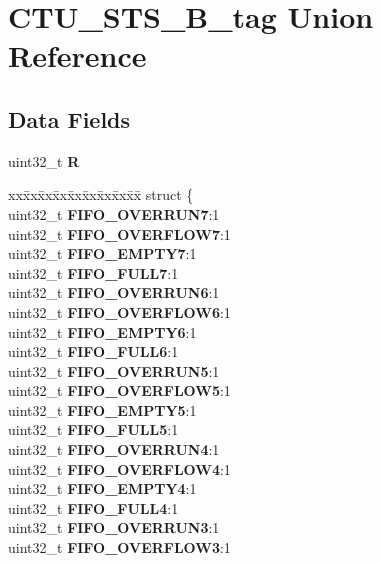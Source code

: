 \hypertarget{unionCTU__STS__32B__tag}{}\section{C\+T\+U\+\_\+\+S\+T\+S\+\_\+B\+\_\+tag Union Reference}
\label{unionCTU__STS__32B__tag}
\subsection*{Data Fields}
\begin{DoxyCompactItemize}
\item 
\mbox{\label{unionCTU__STS__32B__tag_a8c6f365750a958d9b6387c3a33d1c244}} 
uint32\+\_\+t {\bfseries R}
\item 
\mbox{\label{unionCTU__STS__32B__tag_aedca03611b0fa95a491ea184167556b8}} 
\begin{tabbing}
xx\=xx\=xx\=xx\=xx\=xx\=xx\=xx\=xx\=\kill
struct \{\\
\>uint32\_t {\bfseries FIFO\_OVERRUN7}:1\\
\>uint32\_t {\bfseries FIFO\_OVERFLOW7}:1\\
\>uint32\_t {\bfseries FIFO\_EMPTY7}:1\\
\>uint32\_t {\bfseries FIFO\_FULL7}:1\\
\>uint32\_t {\bfseries FIFO\_OVERRUN6}:1\\
\>uint32\_t {\bfseries FIFO\_OVERFLOW6}:1\\
\>uint32\_t {\bfseries FIFO\_EMPTY6}:1\\
\>uint32\_t {\bfseries FIFO\_FULL6}:1\\
\>uint32\_t {\bfseries FIFO\_OVERRUN5}:1\\
\>uint32\_t {\bfseries FIFO\_OVERFLOW5}:1\\
\>uint32\_t {\bfseries FIFO\_EMPTY5}:1\\
\>uint32\_t {\bfseries FIFO\_FULL5}:1\\
\>uint32\_t {\bfseries FIFO\_OVERRUN4}:1\\
\>uint32\_t {\bfseries FIFO\_OVERFLOW4}:1\\
\>uint32\_t {\bfseries FIFO\_EMPTY4}:1\\
\>uint32\_t {\bfseries FIFO\_FULL4}:1\\
\>uint32\_t {\bfseries FIFO\_OVERRUN3}:1\\
\>uint32\_t {\bfseries FIFO\_OVERFLOW3}:1\\

\end{tabbing}
\end{DoxyCompactItemize}
